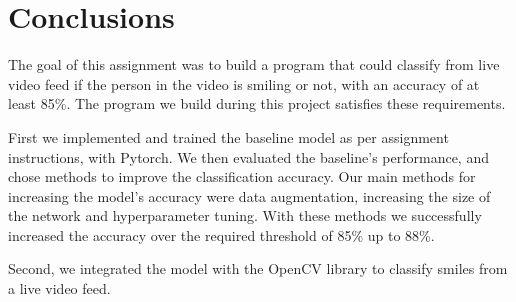 \documentclass[12pt,a4paper,english
]{tunithesis}
\begin{document}
\chapter{Conclusions}
\label{ch:conclusions}

The goal of this assignment was to build a program that could classify from live video feed if the person in the video is smiling or not, with an accuracy of at least 85\%. The program we build during this project satisfies these requirements.

First we implemented and trained the baseline model as per assignment instructions, with Pytorch. We then evaluated the baseline's performance, and chose methods to improve the classification accuracy. Our main methods for increasing the model's accuracy were data augmentation, increasing the size of the network and hyperparameter tuning. With these methods we successfully increased the accuracy over the required threshold of 85\% up to 88\%.

Second, we integrated the model with the OpenCV library to classify smiles from a live video feed.

%
%
\newpage

\printbibliography[title=References]
\end{document}
